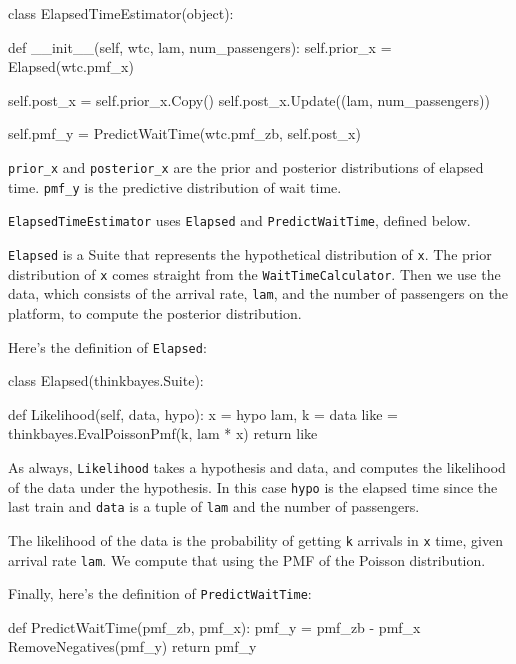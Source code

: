 \documentclass[12pt]{book}
\theoremstyle{exercise}
\begin{document}
\begin{code}
class ElapsedTimeEstimator(object):

    def __init__(self, wtc, lam, num_passengers):
        self.prior_x = Elapsed(wtc.pmf_x)

        self.post_x = self.prior_x.Copy()
        self.post_x.Update((lam, num_passengers))

        self.pmf_y = PredictWaitTime(wtc.pmf_zb, self.post_x)
\end{code}

\verb"prior_x" and \verb"posterior_x" are the prior and
posterior distributions of elapsed time.  \verb"pmf_y" is
the predictive distribution of wait time.

{\tt ElapsedTimeEstimator} uses {\tt Elapsed} and {\tt PredictWaitTime},
defined below.

{\tt Elapsed} is a Suite that represents the hypothetical
distribution of {\tt x}.  The prior distribution of {\tt x}
comes straight from the {\tt WaitTimeCalculator}.  Then we
use the data, which consists of the arrival rate, {\tt lam},
and the number of passengers on the platform, to compute
the posterior distribution.

Here's the definition of {\tt Elapsed}:

\begin{code}
class Elapsed(thinkbayes.Suite):

    def Likelihood(self, data, hypo):
        x = hypo
        lam, k = data
        like = thinkbayes.EvalPoissonPmf(k, lam * x)
        return like
\end{code}

As always, {\tt Likelihood} takes a hypothesis and data, and
computes the likelihood of the data under the hypothesis.
In this case {\tt hypo} is the elapsed time since the last train
and {\tt data} is a tuple of {\tt lam} and the number of
passengers.

The likelihood of the data is the probability of getting
{\tt k} arrivals in {\tt x} time, given arrival rate
{\tt lam}.  We compute that using the PMF of the Poisson
distribution.

Finally, here's the definition of {\tt PredictWaitTime}:

\begin{code}
def PredictWaitTime(pmf_zb, pmf_x):
    pmf_y = pmf_zb - pmf_x
    RemoveNegatives(pmf_y)
    return pmf_y
\end{code}
\end{document}
